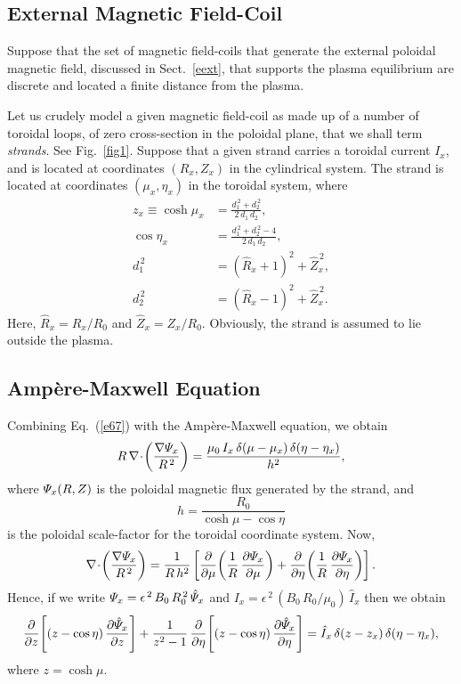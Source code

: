 \documentclass[12pt,prb,aps]{revtex4-1}
\begin{document}
\subsection{External Magnetic Field-Coil}
Suppose that the  set of magnetic field-coils that generate the external poloidal magnetic field, discussed in Sect.~\ref{eext}, that supports the plasma
equilibrium are  discrete and located a finite distance from the plasma. 

Let us crudely model a given magnetic field-coil as made up of a number of toroidal loops,
of zero cross-section in the poloidal plane, that we shall term {\em strands}. See Fig.~\ref{fig1}. Suppose that a given strand carries a toroidal current $I_x$, and is located at coordinates $(R_x, Z_x)$ in the cylindrical system. 
The strand is located at coordinates $(\mu_x, \eta_x)$ in the toroidal system, where\,\cite{arf}
\begin{align}
z_x\equiv \cosh\mu_x&= \frac{d_1^{\,2}+d_2^{\,2}}{2\,d_1\,d_2},\\[0.5ex]
\cos\eta_x&= \frac{d_1^{\,2}+d_2^{\,2}-4}{2\,d_1\,d_2},\\[0.5ex]
d_1^{\,2 }&= (\hat{R}_x+1)^2+\hat{Z}_x^{\,2},\\[0.5ex]
d_2^{\,2} &= (\hat{R}_x-1)^2+\hat{Z}_x^{\,2}.
\end{align}
Here, $\hat{R}_x=R_x/R_0$ and $\hat{Z}_x=Z_x/R_0$. Obviously,  the strand is assumed to lie outside the plasma. 

\subsection{Amp\`{e}re-Maxwell Equation}
Combining Eq.~(\ref{e67}) with the Amp\`{e}re-Maxwell equation, we obtain
\begin{equation}
R\,\nabla\!\cdot\!\left(\frac{\nabla{\mit\Psi}_x}{R^{\,2}}\right)= \frac{\mu_0\,I_x\,\delta(\mu-\mu_x)\,\delta(\eta-\eta_x)}{h^{2}},
\end{equation}
where ${\mit\Psi}_x(R, Z)$ is the poloidal magnetic flux generated by the strand, and 
\begin{equation}
h = \frac{R_0}{\cosh\mu-\cos\eta}
\end{equation}
is the poloidal scale-factor for the toroidal coordinate system.\cite{arf}
Now,\,\cite{morsex}
\begin{equation}
\nabla\!\cdot\!\left(\frac{\nabla{\mit\Psi}_x}{R^{\,2}}\right)= \frac{1}{R\,h^{2}}\left[\frac{\partial}{\partial\mu}\!\left(
\frac{1}{R}\,\frac{\partial{\mit\Psi}_x}{\partial\mu}\right) +\frac{\partial}{\partial\eta}\!\left(\frac{1}{R}\,\frac{\partial{\mit\Psi}_x}{\partial\eta}\right)\right].
\end{equation}
Hence, if we write ${\mit\Psi}_x = \epsilon^{\,2}\,B_0\,R_0^{\,2}\,\hat{\mit\Psi}_x$ and $I_x= \epsilon^{\,2}\,(B_0\,R_0/\mu_0)\,\hat{I}_x$ then we
obtain
\begin{equation}\label{e133}
\frac{\partial}{\partial z}\!\left[(z-\cos\eta)\,\frac{\partial\hat{\mit\Psi}_x}{\partial z}\right]
+\frac{1}{z^{2}-1}\,\frac{\partial}{\partial\eta}\!\left[(z-\cos\eta)\,\frac{\partial\hat{\mit\Psi}_x}{\partial\eta}\right]
=\hat{I}_x\,\delta(z-z_x)\,\delta(\eta-\eta_x),
\end{equation}
where $z=\cosh \mu$. 
\end{document}
